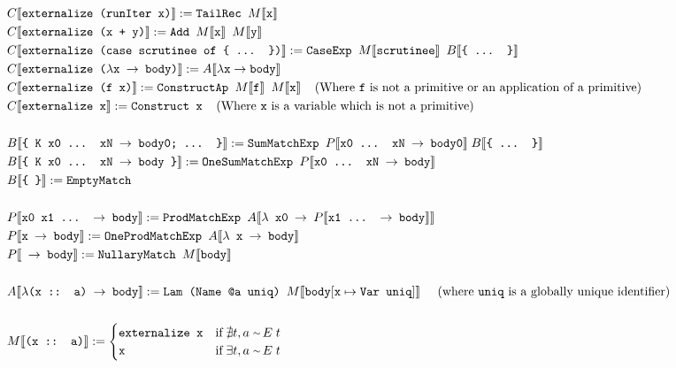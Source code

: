 \documentclass[sigplan,screen]{acmart}
\newcommand{\expr}[1]{\llbracket#1\rrbracket} %
\newcommand{\rarr}{\rightarrow}
\newcommand{\typeeq}{\raise.17ex\hbox{$\scriptstyle\mathtt{\sim}$}\,}
\newcommand{\ttt}{\texttt}
\begin{document}
\begin{align*}
  &C\expr{\ttt{externalize (runIter x)}} := \ttt{TailRec $M\expr{\ttt{x}}$}\\
  &C\expr{\ttt{externalize (x + y)}} := \ttt{Add $M\expr{\ttt{x}}$ $M\expr{\ttt{y}}$}\\
  &C\expr{\ttt{externalize (case scrutinee of \{ ... \})}} := \ttt{CaseExp $M\expr{\ttt{scrutinee}}$ } B\expr{\ttt{\{ ... \}}}\\
  &C\expr{\ttt{externalize ($\lambda$x $\rarr$ body)}} := A\expr{\lambda \ttt{x} \rarr \ttt{body}}\\
  &C\expr{\ttt{externalize (f x)}} := \ttt{ConstructAp $M\expr{\ttt{f}}$ $M\expr{\ttt{x}}$}\;\;\;\;\text{(Where \ttt{f} is not a primitive or an application of a primitive)}\\
  &C\expr{\ttt{externalize x}} := \ttt{Construct x}\;\;\;\;\text{(Where \ttt{x} is a variable which is not a primitive)}\\
  &\\
  &B\expr{\ttt{\{ K x0 ... xN $\rarr$ body0; ... \}}} := \ttt{SumMatchExp }P\expr{\ttt{x0 ... xN $\rarr$ body0}}\; B\expr{\ttt{\{ ... \}}}\\
  &B\expr{\ttt{\{ K x0 ... xN $\rarr$ body \}}} := \ttt{OneSumMatchExp }P\expr{\ttt{x0 ... xN $\rarr$ body}}\\
  &B\expr{\ttt{\{ \}}} := \ttt{EmptyMatch}\\
  &\\
  &P\expr{\ttt{x0 x1 ... $\rarr$ body}} := \ttt{ProdMatchExp }A\expr{\ttt{$\lambda$ x0 $\rarr$ $P\expr{\ttt{x1 ... $\rarr$ body}}$}}\\
  &P\expr{\ttt{x $\rarr$ body}} := \ttt{OneProdMatchExp }A\expr{\ttt{$\lambda$ x $\rarr$ body}}\\
  &P\expr{\ttt{ $\rarr$ body}} := \ttt{NullaryMatch $M\expr{\ttt{body}}$}\\
  &\\
  &A\expr{\ttt{$\lambda$(x :: a) $\rarr$ body}} := \ttt{Lam (Name @a uniq) $M\expr{\ttt{body$[\ttt{x} \mapsto \ttt{Var uniq}]$}}$}\text{\;\;\;\;\;(where \ttt{uniq} is a globally unique identifier)}\\
  &\\
  &M\expr{\ttt{(x :: a)}} :=
    \begin{cases}
      \ttt{externalize x} & \text{if}\; \nexists t, a\; \typeeq E\; t\\
      \ttt{x} & \text{if}\; \exists t, a\; \typeeq E\; t
    \end{cases}
\end{align*}
\end{document}
